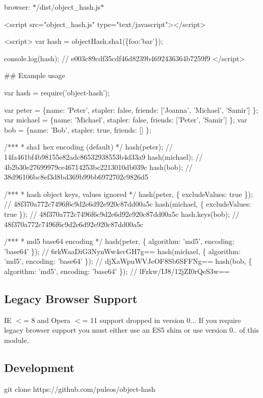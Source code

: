 browser\+: $\ast$/dist/object\+\_\+hash.js$\ast$ 
\begin{DoxyCode}
<script src="object\_hash.js" type="text/javascript"></script>

<script>
  var hash = objectHash.sha1(\{foo:'bar'\}); 

  console.log(hash); // e003c89cdf35cdf46d8239b4692436364b7259f9
</script>
\end{DoxyCode}


\#\# Example usage 
\begin{DoxyCode}
var hash = require('object-hash');

var peter = \{name: 'Peter', stapler: false, friends: ['Joanna', 'Michael', 'Samir'] \};
var michael = \{name: 'Michael', stapler: false, friends: ['Peter', 'Samir'] \};
var bob = \{name: 'Bob', stapler: true, friends: [] \};

/***
 * sha1 hex encoding (default)
 */
hash(peter);
// 14fa461bf4b98155e82adc86532938553b4d33a9
hash(michael);
// 4b2b30e27699979ce46714253bc2213010db039c
hash(bob);
// 38d96106bc8ef3d8bd369b99bb6972702c9826d5

/***
 * hash object keys, values ignored
 */
hash(peter, \{ excludeValues: true \});
// 48f370a772c7496f6c9d2e6d92e920c87dd00a5c
hash(michael, \{ excludeValues: true \});
// 48f370a772c7496f6c9d2e6d92e920c87dd00a5c
hash.keys(bob);
// 48f370a772c7496f6c9d2e6d92e920c87dd00a5c

/***
 * md5 base64 encoding
 */
hash(peter, \{ algorithm: 'md5', encoding: 'base64' \});
// 6rkWaaDiG3NynWw4svGH7g==
hash(michael, \{ algorithm: 'md5', encoding: 'base64' \});
// djXaWpuWVJeOF8Sb6SFFNg==
hash(bob, \{ algorithm: 'md5', encoding: 'base64' \});
// lFzkw/IJ8/12jZI0rQeS3w==
\end{DoxyCode}


\subsection*{Legacy Browser Support}

IE $<$= 8 and Opera $<$= 11 support dropped in version 0... If you require legacy browser support you must either use an E\+S5 shim or use version 0.. of this module.

\subsection*{Development}


\begin{DoxyCode}
git clone https://github.com/puleos/object-hash
\end{DoxyCode}


